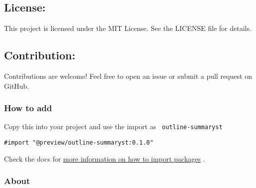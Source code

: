 \subsection{License:}\label{license}

This project is licensed under the MIT License. See the LICENSE file for
details.

\subsection{Contribution:}\label{contribution}

Contributions are welcome! Feel free to open an issue or submit a pull
request on GitHub.

\subsubsection{How to add}\label{how-to-add}

Copy this into your project and use the import as
\texttt{\ outline-summaryst\ }

\begin{verbatim}
#import "@preview/outline-summaryst:0.1.0"
\end{verbatim}



Check the docs for
\href{https://typst.app/docs/reference/scripting/\#packages}{more
information on how to import packages} .

\subsubsection{About}\label{about}

